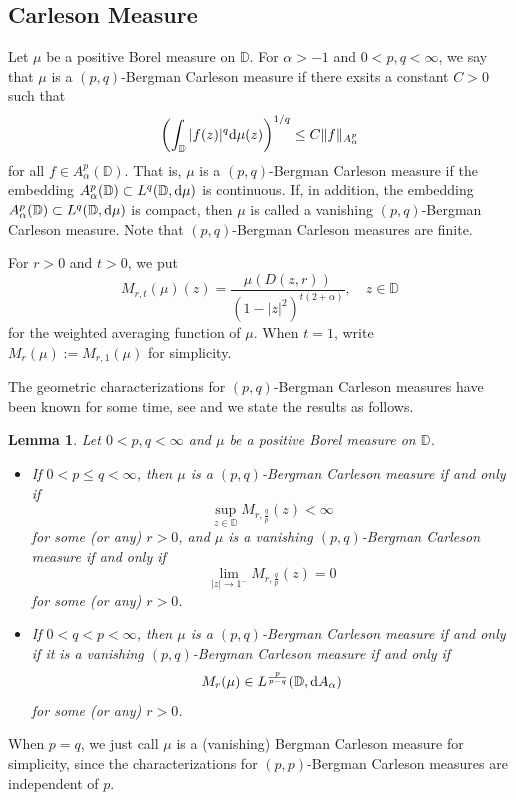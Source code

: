 \documentclass[preprint,12pt,times]{elsarticle}
\newtheorem{lemma}[theorem]{Lemma}
\theoremstyle{definition}
\theoremstyle{remark}
\numberwithin{equation}{section}
\begin{document}
\subsection{Carleson Measure}

Let $\mu$ be a positive Borel measure on $\mathbb{D}$. For $\alpha>-1$ and $0<p,q<\infty$, we say that $\mu$ is a $(p,q)$-Bergman Carleson measure if there exsits a constant $C>0$ such that
\begin{equation*}
\left(\int_{\mathbb{D}}|f(z)|^q{\rm d}\mu(z)\right)^{1/q}\leq C\|f\|_{A_{\alpha}^p}
\end{equation*}
for all $f\in A_{\alpha}^p(\mathbb{D})$. That is, $\mu$ is a $(p,q)$-Bergman Carleson measure if the embedding $A_{\alpha}^p(\mathbb{D})\subset L^q(\mathbb{D}, {\rm d}\mu)$ is continuous. If, in addition, the embedding $A_{\alpha}^p(\mathbb{D})\subset L^q(\mathbb{D},{\rm d}\mu)$ is compact, then $\mu$ is called a vanishing $(p,q)$-Bergman Carleson measure. Note that $(p,q)$-Bergman Carleson measures are finite.

For $r>0$ and $t>0$, we put
\[M_{r,t}(\mu)(z)=\frac{\mu(D(z,r))}{(1-|z|^2)^{t(2+\alpha)}},\quad z\in\mathbb{D}\]
for the weighted averaging function of $\mu$. When $t=1$, write $M_r(\mu):=M_{r,1}(\mu)$ for simplicity.

The geometric characterizations for $(p,q)$-Bergman Carleson measures have been known for some time, see \cite{18} and we state the results as follows.

\begin{lemma}\label{lemma2.7}
Let $0<p,q<\infty$ and $\mu$ be a positive Borel measure on $\mathbb{D}$.
\begin{itemize}
\item[(i)] If $0<p\leq q<\infty$, then $\mu$ is a $(p,q)$-Bergman Carleson measure if and only if 
$$\sup_{z\in\mathbb{D}}M_{r,\frac{q}{p}}(z)<\infty$$
for some (or any) $r>0$, and $\mu$ is a vanishing $(p,q)$-Bergman Carleson measure if and only if
$$\lim_{|z|\to 1^-}M_{r,\frac{q}{p}}(z)=0$$
for some (or any) $r>0$.
\item[(ii)] If $0<q<p<\infty$, then $\mu$ is a $(p,q)$-Bergman Carleson measure if and only if it is a vanishing $(p,q)$-Bergman Carleson measure if and only if
$$M_r(\mu)\in L^{\frac{p}{p-q}}(\mathbb{D},{\rm d}A_{\alpha})$$
for some (or any) $r>0$.
\end{itemize}
\end{lemma}

When $p=q$, we just call $\mu$ is a (vanishing) Bergman Carleson measure for simplicity, since the characterizations for $(p,p)$-Bergman Carleson measures are independent of $p$.
\end{document}
